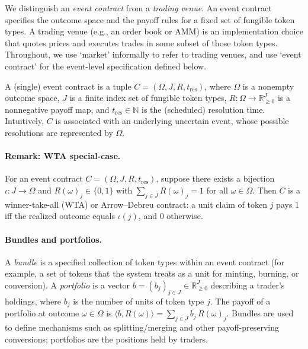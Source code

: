 



We distinguish an \emph{event contract} from a \emph{trading venue}. An event contract specifies the outcome space and the payoff rules for a fixed set of fungible token types. A trading venue (e.g., an order book or AMM) is an implementation choice that quotes prices and executes trades in some subset of those token types. Throughout, we use `market' informally to refer to trading venues, and use `event contract' for the event-level specification defined below.

\begin{definition}\label{def:contract}
A (single) event contract is a tuple $C=(\Omega,J,R,t_{\mathrm{res}})$, where $\Omega$ is a nonempty outcome space, $J$ is a finite index set of fungible token types, $R:\Omega\to\mathbb{R}_{\ge 0}^{J}$ is a nonnegative payoff map, and $t_{\mathrm{res}}\in\mathbb{N}$ is the (scheduled) resolution time. Intuitively, $C$ is associated with an underlying uncertain event, whose possible resolutions are represented by $\Omega$.
\end{definition}

\paragraph{Remark: WTA special-case.}
For an event contract $C=(\Omega,J,R,t_{\mathrm{res}})$, suppose there exists a bijection $\iota:J\to\Omega$ and
$R(\omega)_j\in\{0,1\}$ with $\sum_{j\in J} R(\omega)_j=1$ for all $\omega\in\Omega$.
Then $C$ is a winner-take-all (WTA) or Arrow--Debreu contract: a unit claim of token $j$ pays $1$ iff the realized outcome equals $\iota(j)$, and $0$ otherwise.

\paragraph{Bundles and portfolios.}
A \emph{bundle} is a specified collection of token types within an event contract (for example, a set of tokens that the system treats as a unit for minting, burning, or conversion). A \emph{portfolio} is a vector $b=(b_j)_{j\in J}\in\mathbb{R}_{\ge 0}^{J}$ describing a trader's holdings, where $b_j$ is the number of units of token type $j$. The payoff of a portfolio at outcome $\omega\in\Omega$ is $\langle b, R(\omega)\rangle=\sum_{j\in J} b_j\,R(\omega)_j$. Bundles are used to define mechanisms such as splitting/merging and other payoff-preserving conversions; portfolios are the positions held by traders.

